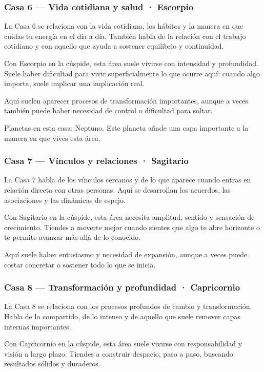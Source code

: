 \documentclass[11pt,a4paper]{article}
\begin{document}
\subsubsection*{Casa 6 — Vida cotidiana y salud · Escorpio}
La Casa 6 se relaciona con la vida cotidiana, los hábitos y la manera en que cuidas tu energía en el día a día. También habla de la relación con el trabajo cotidiano y con aquello que ayuda a sostener equilibrio y continuidad.

Con Escorpio en la cúspide, esta área suele vivirse con intensidad y profundidad. Suele haber dificultad para vivir superficialmente lo que ocurre aquí: cuando algo importa, suele implicar una implicación real.

Aquí suelen aparecer procesos de transformación importantes, aunque a veces también puede haber necesidad de control o dificultad para soltar.

Planetas en esta casa: Neptuno. Este planeta añade una capa importante a la manera en que vives esta área.

\subsubsection*{Casa 7 — Vínculos y relaciones · Sagitario}
La Casa 7 habla de los vínculos cercanos y de lo que aparece cuando entras en relación directa con otras personas. Aquí se desarrollan los acuerdos, las asociaciones y las dinámicas de espejo.

Con Sagitario en la cúspide, esta área necesita amplitud, sentido y sensación de crecimiento. Tiendes a moverte mejor cuando sientes que algo te abre horizonte o te permite avanzar más allá de lo conocido.

Aquí suele haber entusiasmo y necesidad de expansión, aunque a veces puede costar concretar o sostener todo lo que se inicia.

\subsubsection*{Casa 8 — Transformación y profundidad · Capricornio}
La Casa 8 se relaciona con los procesos profundos de cambio y transformación. Habla de lo compartido, de lo intenso y de aquello que suele remover capas internas importantes.

Con Capricornio en la cúspide, esta área suele vivirse con responsabilidad y visión a largo plazo. Tiendes a construir despacio, paso a paso, buscando resultados sólidos y duraderos.
\end{document}
